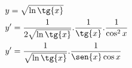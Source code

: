 \begin{ex}
\begin{align}
&y=\sqrt{\ln{\tg{x}}}\nonumber\\
&y'=\frac{1}{2\sqrt{\ln{\tg{x}}}}.\frac{1}{\tg{x}}.\frac{1}{\cos^2{x}}\nonumber\\
&y'=\frac{1}{\sqrt{\ln{\tg{x}}}}.\frac{1}{\sen{x}\cos{x}}\nonumber
\end{align}
\end{ex}